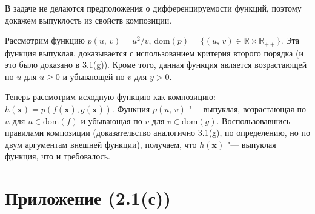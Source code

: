 \documentclass[a4paper,12pt]{article}
\begin{document}
\begin{enumerate}
		 В задаче не делаются предположения о дифференцируемости функций, поэтому докажем выпуклость из свойств композиции. 
		 
		 Рассмотрим функцию $p(u,\,v) = u^2/v$, $\text{dom}(p) = \{(u,\,v)\in\mathbb{R}\times\mathbb{R}_{++}\}$. Эта функция выпуклая, доказывается с использованием критерия второго порядка (и это было доказано в 3.1(g)). Кроме того, данная функция является возрастающей по $u$ для $u \geqslant 0$ и убывающей по $v$ для $y>0$.
		 
		 Теперь рассмотрим исходную функцию как композицию: $h(\mathbf{x}) = p(f(\mathbf{x}), g(\mathbf{x}))$. Функция $p(u,\,v)$ "--- выпуклая, возрастающая по $u$ для $u\in\text{dom}(f)$ и убывающая по $v$ для $v\in\text{dom}(g)$. Воспользовавшись правилами композиции (доказательство аналогично 3.1(g), по определению, но по двум аргументам внешней функции), получаем, что $h(\mathbf{x})$ "--- выпуклая функция, что и требовалось.
		 
		 
		
	\end{enumerate}
	
	\newpage
	\section{Приложение (2.1(с))}
	
\end{document}

